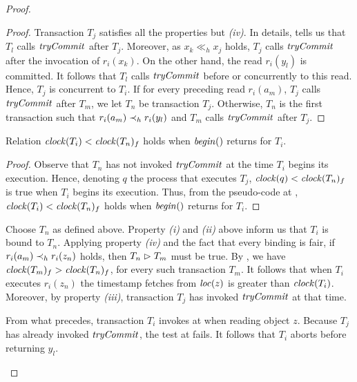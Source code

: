 \begin{proof}
\begin{itemize}
    \begin{proof}
      Transaction $T_j$ satisfies all the properties but \emph{(iv)}.
      In details,  tells us that $T_l$ calls $\stmTryCommitFunction$ after $T_j$.
      Moreover, as $x_k \ll_h x_j$ holds, $T_j$ calls $\stmTryCommitFunction$ after the invocation of $r_i(x_k)$.
      On the other hand, the read $r_i(y_l)$ is committed.
      It follows that $T_l$ calls $\stmTryCommitFunction$ before or concurrently to this read.
      Hence, $T_j$ is concurrent to $T_i$.
      If for every preceding read $r_i(a_m)$, $T_j$ calls $\stmTryCommitFunction$ after $T_m$, we let $T_n$ be transaction $T_j$.
      Otherwise, $T_n$ is the first transaction such that $r_i(a_{m}) \hb_h r_i(y_l)$ and $T_m$ calls $\stmTryCommitFunction$ after $T_j$.
    \end{proof}

    \begin{claim}
      Relation $\clockOf{T_i} < \clockOf{T_n}_f$ holds when $\stmBegin$ returns for $T_i$.
    \end{claim}
    
    \begin{proof}
      Observe that $T_n$ has not invoked $\stmTryCommitFunction$ at the time $T_i$ begins its execution.
      Hence, denoting $q$ the process that executes $T_j$, $\clockOf{q} < \clockOf{T_n}_f$ is true when $T_i$ begins its execution.
      Thus, from the pseudo-code at , $\clockOf{T_i} < \clockOf{T_n}_f$ holds when $\stmBegin$ returns for $T_i$.
    \end{proof}
    
    Choose $T_n$ as defined above.
    Property \emph{(i)} and \emph{(ii)} above inform us that $T_i$ is bound to $T_n$.
    Applying property \emph{(iv)} and the fact that every binding is fair, if $r_i(a_m) \hb_h r_i(z_n)$ holds, then $T_n \depends T_m$ must be true.
    By , we have $\clockOf{T_m}_f > \clockOf{T_n}_f$, for every such transaction $T_m$.
    It follows that when $T_i$ executes $r_i(z_n)$ the timestamp fetches from $\locationOf{z}$ is greater than $\clockOf{T_i}$.
    Moreover, by property \emph{(iii)}, transaction $T_j$ has invoked $\stmTryCommitFunction$ at that time.

    From what precedes, transaction $T_i$ invokes \stmExtendFunction at  when reading object $z$.
    Because $T_j$ has already invoked $\stmTryCommitFunction$, the test at  fails.
    It follows that $T_i$ aborts before returning $y_l$.
  \end{itemize}
\end{proof}


